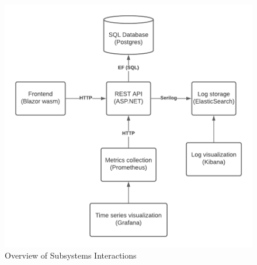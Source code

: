\begin{figure}[h!]
    \centering
    \includegraphics[scale=0.7]{images/InteractionDiagram.png}
    \caption{ Overview of Subsystems Interactions }
\end{figure}  

